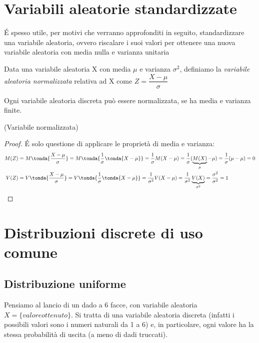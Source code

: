 \section{Variabili aleatorie standardizzate}
 \label{sec:02_standardizzate}
 
 \'E spesso utile, per motivi che verranno approfonditi in seguito, standardizzare una variabile aleatoria, ovvero riscalare i suoi valori per ottenere una nuova variabile aleatoria con media nulla e varianza unitaria
 
 \begin{definizione} Data una variabile aleatoria X con media \(\mu\) e varianza \(\sigma^2\), definiamo la \emph{variabile aleatoria normalizzata} relativa ad X come \(\boxed{Z = \dfrac{X-\mu}{\sigma}}\)
 \end{definizione}
 
 Ogni variabile aleatoria discreta può essere normalizzata, se ha media e varianza finite.

\begin{proprieta} (Variabile normalizzata) \quad {} \quad {}
\end{proprieta}
\begin{proof} \'E solo questione di applicare le proprietà di media e varianza:
\[\begin{split}M(Z) &= M\tonda{\dfrac{X-\mu}{\sigma}} = M\tonda{\dfrac{1}{\sigma} \tonda{X-\mu}} = \dfrac{1}{\sigma} M(X-\mu) = \dfrac{1}{\sigma} (\underbrace{M(X)}_{\mu}-\mu) =  \dfrac{1}{\sigma} (\mu-\mu)=0  \\
V(Z) &= V\tonda{\dfrac{X-\mu}{\sigma}} = V\tonda{\dfrac{1}{\sigma} \tonda{X-\mu}} = \dfrac{1}{\sigma^2} V(X-\mu)=\dfrac{1}{\sigma^2} \underbrace{V(X)}_{\sigma^2} = \dfrac{\sigma^2}{\sigma^2} = 1\end{split}\]
\end{proof}
\section{Distribuzioni discrete di uso comune}
\label{sec:02_distrib_discrete}

\subsection{Distribuzione uniforme}
Pensiamo al lancio di un dado a 6 facce, con variabile aleatoria \(X = \{valore ottenuto\}\). Si tratta di una variabile aleatoria discreta (infatti i possibili valori sono i numeri naturali da 1 a 6) e, in particolare, ogni valore ha la stessa probabilità di uscita (a meno di dadi truccati).

